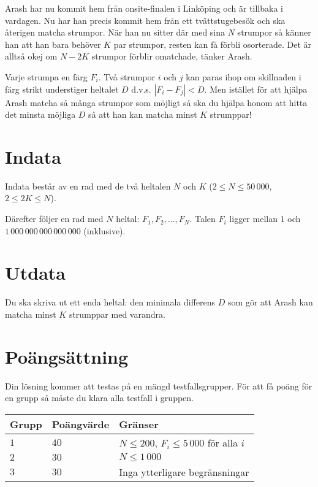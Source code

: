 Arash har nu kommit hem från onsite-finalen i Linköping och är tillbaka i
vardagen. Nu har han precis kommit hem från ett tvättstugebesök och ska
återigen matcha strumpor. När han nu sitter där med sina $N$ strumpor
så känner han att han bara behöver $K$ par strumpor, resten kan få förbli
osorterade. Det är alltså okej om $N-2K$ strumpor förblir omatchade, tänker Arash.

Varje strumpa en färg $F_i$. Två strumpor $i$ och $j$ kan paras ihop om
skillnaden i färg strikt understiger heltalet $D$ d.v.s. $|F_{i} - F_{j}|<D$.
Men istället för att hjälpa Arash matcha så många strumpor som möjligt så ska
du hjälpa honom att hitta det minsta möjliga $D$
så att han kan matcha minst $K$ strumppar!

\section*{Indata}

Indata består av en rad med de två heltalen $N$ och $K$ ($2 \le N
\le 50\,000$, $2 \le 2K \le N$).

Därefter följer en rad med $N$ heltal: $F_1, F_2, \dots, F_N$.
Talen $F_i$ ligger mellan $1$ och $1\,000\,000\,000\,000\,000$ (inklusive).

\section*{Utdata}

Du ska skriva ut ett enda heltal: den minimala differens $D$ som gör att Arash kan
matcha minst $K$ strumppar med varandra.

\section*{Poängsättning}
Din lösning kommer att testas på en mängd testfallsgrupper.
För att få poäng för en grupp så måste du klara alla testfall i gruppen.

\noindent
\begin{tabular}{| l | l | l |}
  \hline
  Grupp & Poängvärde & Gränser \\ \hline
  $1$   & $40$       & $N \leq 200$, $F_i \leq 5\,000$ för alla $i$ \\ \hline
  $2$   & $30$       & $N \leq 1\,000$ \\ \hline
  $3$   & $30$       & Inga ytterligare begränsningar \\ \hline
\end{tabular}